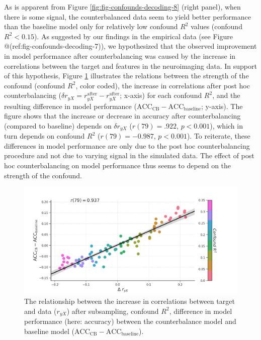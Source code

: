 \documentclass[11pt,american,]{memoir} %
\begin{document}
As is apparent from Figure \ref{fig:fig-confounds-decoding-8} (right panel), when there is some signal, the counterbalanced data seem to yield better performance than the baseline model only for relatively low confound \(R^2\) values (confound \(R^2 < 0.15\)). As suggested by our findings in the empirical data (see Figure @(ref:fig-confounds-decoding-7)), we hypothesized that the observed improvement in model performance after counterbalancing was caused by the increase in correlations between the target and features in the neuroimaging data. In support of this hypothesis, Figure \ref{fig:fig-confounds-decoding-9} illustrates the relations between the strength of the confound (confound \(R^2\), color coded), the increase in correlations after post hoc counterbalancing (\(\delta r_{yX} = r_{yX}^{\mathrm{after}} - r_{yX}^{\mathrm{after}}\); x-axis) for each confound \(R^2\), and the resulting difference in model performance (\(\mathrm{ACC}_{\mathrm{CB}} - \mathrm{ACC}_{\mathrm{baseline}}\); y-axis). The figure shows that the increase or decrease in accuracy after counterbalancing (compared to baseline) depends on \(\delta r_{yX}\) (\(r(79) = .922\), \(p < 0.001\)), which in turn depends on confound \(R^2\) (\(r(79) = -0.987\), \(p < 0.001\)). To reiterate, these differences in model performance are only due to the post hoc counterbalancing procedure and not due to varying signal in the simulated data. The effect of post hoc counterbalancing on model performance thus seems to depend on the strength of the confound.

\begin{figure}
\centering
\includegraphics{_bookdown_files/confounds-decoding-files/figures/figure_9.pdf}
\caption{\label{fig:fig-confounds-decoding-9}The relationship between the increase in correlations between target and data (\(r_{yX}\)) after subsampling, confound \(R^2\), difference in model performance (here: accuracy) between the counterbalance model and baseline model (\(\mathrm{ACC}_{\mathrm{CB}} - \mathrm{ACC}_{\mathrm{baseline}}\)).}
\end{figure}
\end{document}
